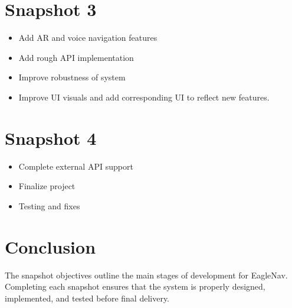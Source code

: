 \documentclass{article}
\begin{document}
\section{Snapshot 3}
\begin{itemize}
\item Add AR and voice navigation features
\item Add rough API implementation
\item Improve robustness of system
\item Improve UI visuals and add corresponding UI to reflect new features.
\end{itemize}

\section{Snapshot 4}
\begin{itemize}
\item Complete external API support
\item Finalize project
\item Testing and fixes
\end{itemize}

\section{Conclusion}
The snapshot objectives outline the main stages of development for EagleNav. Completing each snapshot ensures that the system is properly designed, implemented, and tested before final delivery.
\end{document}
